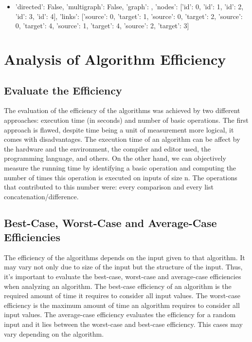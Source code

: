 \documentclass[...]{revdetua}
\begin{document}
\begin{itemize}
\item {'directed': False, 'multigraph': False, 'graph': {}, 'nodes': [{'id': 0}, {'id': 1}, {'id': 2}, {'id': 3}, {'id': 4}], 'links': [{'source': 0, 'target': 1}, {'source': 0, 'target': 2}, {'source': 0, 'target': 4}, {'source': 
1, 'target': 4}, {'source': 2, 'target': 3}]}
\end{itemize}

\section{Analysis of Algorithm Efficiency}

\subsection{Evaluate the Efficiency}

The evaluation of the efficiency of the algorithms was achieved by two different approaches: execution time (in seconds) and number of basic operations. The first approach is flawed, despite time being a unit of measurement more logical, it comes with disadvantages. The execution time of an algorithm can be affect by the hardware and the environment, the compiler and editor used, the programming language, and others. On the other hand, we can objectively measure the running time by identifying a basic operation and computing the number of times this operation is executed on inputs of size n.
The operations that contributed to this number were: every comparison and every list concatenation/difference.

\subsection{Best-Case, Worst-Case and Average-Case Efficiencies}
The efficiency of the algorithms depends on the input given to that algorithm. It may vary not only due to size of the input but the structure of the input. Thus, it's important to evaluate the best-case, worst-case and average-case efficiencies when analyzing an algorithm.
The best-case efficiency of an algorithm is the required amount of time it requires to consider all input values. 
The worst-case efficiency is the maximum amount of time an algorithm requires to consider all input values.
The average-case efficiency evaluates the efficiency for a random input and it lies between the worst-case and best-case efficiency.
This cases may vary depending on the algorithm.
\end{document}
